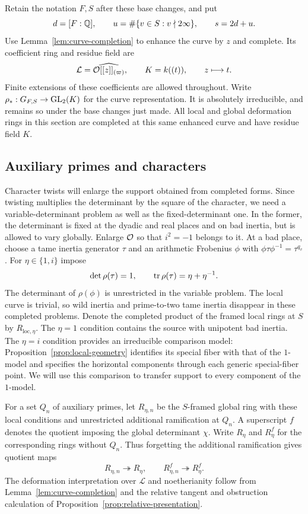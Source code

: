 Retain the notation $F,S$ after these base changes, and put
\[
 d=[F:\mathbb Q],\qquad
 u=\#\{v\in S:v\nmid 2\infty\},\qquad s=2d+u.
\]
Use Lemma~\ref{lem:curve-completion} to enhance the curve by $z$ and
complete.  Its coefficient ring and residue field are
\[
 \mathcal L=\widehat{\mathcal O[[z]]_{(\varpi)}},\qquad K=k((t)),
 \qquad z\longmapsto t.
\]
Finite extensions of these coefficients are allowed throughout.  Write
$\rho_*:G_{F,S}\to\operatorname{GL}_2(K)$ for the curve representation.  It is
absolutely irreducible, and remains so under the base changes just made.
All local and global deformation rings in this section are completed
at this same enhanced curve and have residue field $K$.

\subsection{Auxiliary primes and characters}

Character twists will enlarge the support obtained from completed
forms. Since twisting multiplies the determinant by the square of the
character, we need a variable-determinant problem as well as the
fixed-determinant one. In the former, the determinant is fixed at
the dyadic and real
places and on bad inertia, but is allowed to vary globally.  Enlarge
$\mathcal O$ so that $i^2=-1$ belongs to it.  At a bad place, choose a tame
inertia generator $\tau$ and an arithmetic Frobenius $\phi$ with
$\phi\tau\phi^{-1}=\tau^{q_v}$.  For $\eta\in\{1,i\}$ impose
\[
 \det\rho(\tau)=1,\qquad
 \operatorname{tr}\rho(\tau)=\eta+\eta^{-1}.
\]
The determinant of $\rho(\phi)$ is unrestricted in the variable
problem.  The local curve is trivial, so wild inertia and prime-to-two
tame inertia disappear in these completed problems.  Denote the
completed product of the framed local rings at $S$ by
$R_{\mathrm{loc},\eta}$.
The $\eta=1$ condition contains the source with unipotent bad inertia.
The $\eta=i$ condition provides an irreducible comparison model:
Proposition~\ref{prop:local-geometry} identifies its special fiber
with that of the $1$-model and specifies the horizontal components
through each generic special-fiber point. We will use this comparison
to transfer support to every component of the $1$-model.

For a set $Q_n$ of auxiliary primes, let $R_{\eta,n}$ be the
$S$-framed global ring with these local conditions and unrestricted
additional ramification at $Q_n$.  A superscript $f$ denotes the
quotient imposing the global determinant $\chi$.  Write $R_\eta$ and
$R_\eta^f$ for the corresponding rings without $Q_n$.  Thus forgetting
the additional ramification gives quotient maps
\[
 R_{\eta,n}\twoheadrightarrow R_\eta,
 \qquad R_{\eta,n}^f\twoheadrightarrow R_\eta^f.
\]
The deformation interpretation over $\mathcal L$ and noetherianity
follow from Lemma~\ref{lem:curve-completion} and the relative tangent
and obstruction calculation of Proposition~\ref{prop:relative-presentation}.

